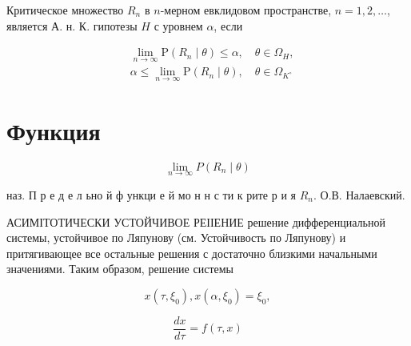 \documentclass[10pt]{article}
\begin{document}
Критическое множество $R_{n}$ в $n$-мерном евклидовом пространстве, $n=1,2, \ldots$, является А. н. К. гипотезы $H$ с уровнем $\alpha$, если



\[

\begin{aligned}

& \lim _{n \rightarrow \infty} \mathrm{P}\left(R_{n} \mid \theta\right) \leqslant \alpha, \quad \theta \in \Omega_{H}, \\

& \alpha \leqslant \lim _{n \rightarrow \infty} \mathrm{P}\left(R_{n} \mid \theta\right), \quad \theta \in \Omega_{K^{\circ}}

\end{aligned}

\]



\section{Функция}

\[

\lim _{n \rightarrow \infty} P\left(R_{n} \mid \theta\right)

\]



наз. П р е д е л ьно й ф ункци е й мо н н с ти к рите р и я $R_{n}$. О.В. Налаевский.



АСИМІТОТИЧЕСКИ УСТОЙЧИВОЕ РЕІІЕНИЕ решение дифференциальной системы, устойчивое по Ляпунову (см. Устойчивость по Ляпунову) и притягивающее все остальные решения с достаточно близкими начальными значениями. Таким образом, решение системы



\[

x\left(\tau, \xi_{0}\right), x\left(\alpha, \xi_{0}\right)=\xi_{0},

\]



\[

\frac{d x}{d \tau}=f(\tau, x)

\]
\end{document}
